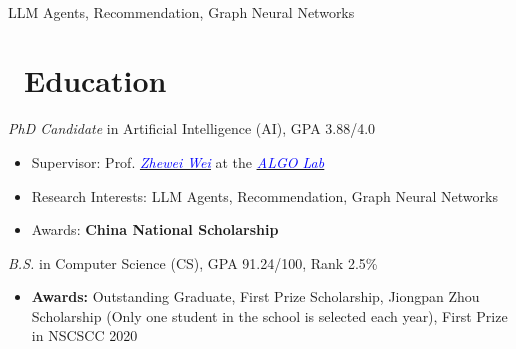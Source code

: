 \documentclass{resume}
\begin{document}

\begin{minipage}{0.8\textwidth}
 \\
{\large LLM Agents, Recommendation, Graph Neural Networks} \\
\end{minipage}

\section{\faGraduationCap\ Education}
\textit{PhD Candidate} in Artificial Intelligence (AI), { GPA }3.88/4.0
\begin{itemize}
  \item {Supervisor: }Prof. \href{https://weizhewei.com}{\it \underline{\textcolor{blue}{Zhewei Wei}}} at the \href{https://weizhewei.com/people}{\it \underline{\textcolor{blue}{ALGO Lab}}}
  \item {Research Interests: } LLM Agents, Recommendation, Graph Neural Networks
  \item {Awards: } {\bf China National Scholarship}
\end{itemize}
\textit{B.S.} in Computer Science (CS), GPA 91.24/100, Rank 2.5\%
\begin{itemize}
  \item {\bf Awards: } Outstanding Graduate, First Prize Scholarship, Jiongpan Zhou Scholarship (Only one student in the school is selected each year), First Prize in NSCSCC 2020
\end{itemize}
\end{document}
